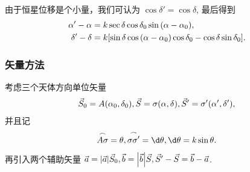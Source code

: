 \documentclass[UTF8, 12pt, a4paper, oneside, onecolumn, fontset=none]{ctexart}
\begin{document}
由于恒星位移是个小量，我们可认为 $\cos{\delta'}=\cos{\delta}$, 最后得到
\begin{align}
\alpha'-\alpha&=k\sec{\delta}\cos{\delta_{0}}\sin{\mleft(\alpha-\alpha_{0}\mright)},\label{1.2.10}\\
\delta'-\delta&=k\mleft[\sin{\delta}\cos{\mleft(\alpha-\alpha_{0}\mright)}\cos{\delta_{0}}-\cos{\delta}\sin{\delta_{0}}\mright].\label{1.2.11}
\end{align}

\subsubsection{矢量方法}
考虑三个天体方向单位矢量
\begin{align}
\vec{S}_{0}=A\mleft(\alpha_{0},\delta_{0}\mright),\vec{S}=\sigma\mleft(\alpha,\delta\mright),\vec{S}'=\sigma'\mleft(\alpha',\delta'\mright),
\end{align}
并且记
\begin{equation}
\overset{\frown}{A\sigma}=\theta,\overset{\frown}{\sigma\sigma'}=\d\theta,\d\theta=k\sin{\theta}.
\end{equation}
再引入两个辅助矢量 $\vec{a}=\mleft\vert\vec{a}\mright\vert\vec{S}_{0},\vec{b}=\mleft\vert\vec{b}\mright\vert\vec{S},\vec{S}'-\vec{S}=\vec{b}-\vec{a}$.
\end{document}
